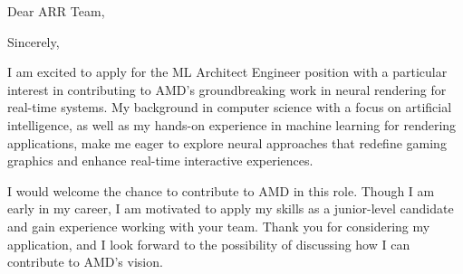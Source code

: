 \documentclass[12pt,a4paper]{moderncv}
\makeatletter
\newcommand*{\subject}[1]{\def\@subject{#1}}
\makeatother
\begin{document}
\date{Würzburg, \today}%
\subject{Application for ML Architect Engineer (Munich, ID 47288)}
\opening{Dear ARR Team,}
    
\closing{Sincerely,}

\makelettertitle
I am excited to apply for the ML Architect Engineer position with a particular interest 
in contributing to AMD’s groundbreaking work in neural rendering for real-time systems. 
My background in computer science with a focus on artificial intelligence, 
as well as my hands-on experience in machine learning for rendering applications, 
make me eager to explore neural approaches that redefine gaming graphics and enhance 
real-time interactive experiences.

 

 



I would welcome the chance to contribute to AMD in this role. 
Though I am early in my career, I am motivated to apply my skills as a junior-level candidate and gain experience working with your team.
Thank you for considering my application, 
and I look forward to the possibility of discussing how I can contribute to AMD's vision.
\vspace{0.5cm}


\makeletterclosing
\end{document}

